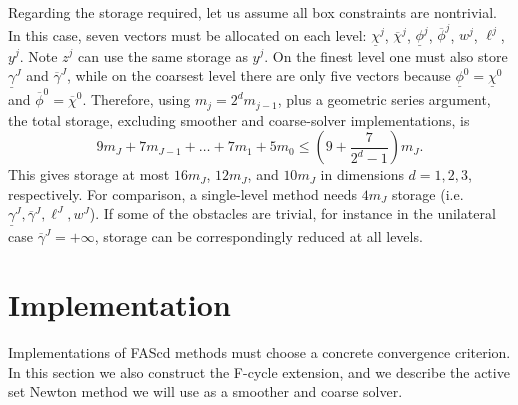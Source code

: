 \documentclass[letterpaper,final,12pt,reqno]{amsart}
\theoremstyle{cstyle}
\theoremstyle{cstyle*}
\theoremstyle{dstyle}
\numberwithin{equation}{section}
\numberwithin{figure}{section}
\numberwithin{table}{section}
\numberwithin{theorem}{section}
\begin{document}
Regarding the storage required, let us assume all box constraints are nontrivial. In this case, seven vectors must be allocated on each level: $\underline{\chi}^j$, $\overline{\chi}^j$, $\underline{\phi}^j$, $\overline{\phi}^j$, $w^j$, $\ell^j$, $y^j$.  Note $z^j$ can use the same storage as $y^j$.  On the finest level one must also store $\underline{\gamma}^J$ and $\overline{\gamma}^J$, while on the coarsest level there are only five vectors because $\underline{\phi}^0=\underline{\chi}^0$ and $\overline{\phi}^0=\overline{\chi}^0$.  Therefore, using $m_j=2^d m_{j-1}$, plus a geometric series argument, the total storage, excluding smoother and coarse-solver implementations, is
\begin{equation}
9 m_J + 7 m_{J-1} + \dots + 7 m_1 + 5 m_0 \le \left(9 + \frac{7}{2^d - 1}\right) m_J.
\end{equation}
This gives storage at most $16m_J$, $12m_J$, and $10m_J$ in dimensions $d=1,2,3$, respectively.  For comparison, a single-level method needs $4 m_J$ storage (i.e.~$\underline{\gamma}^J,\overline{\gamma}^J,\ell^J,w^J$).  If some of the obstacles are trivial, for instance in the unilateral case $\overline{\gamma}^J=+\infty$, storage can be correspondingly reduced at all levels.


\section{Implementation} \label{sec:implementation}

Implementations of FAScd methods must choose a concrete convergence criterion.  In this section we also construct the F-cycle extension, and we describe the active set Newton method we will use as a smoother and coarse solver.
\end{document}

